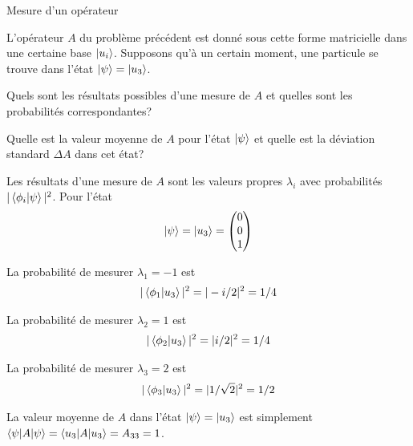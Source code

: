 \documentclass[12pt,solution=false]{uqtrassignment}
\begin{document}
\begin{problem}{Mesure d'un opérateur} %

L'opérateur $A$ du problème précédent
  est donné sous cette forme matricielle
  dans une certaine base $\ket{u_i}$.
%
Supposons qu'à un certain moment,
  une particule se trouve dans l'état $\ket{\psi}=\ket{u_3}$.
%

\subproblem
Quels sont les résultats possibles d'une mesure de $A$
  et quelles sont les probabilités correspondantes?
  
\subproblem
Quelle est la valeur moyenne de $A$ pour l'état $\ket{\psi}$
  et quelle est la déviation standard $\Delta A$ dans cet état?

\begin{solution}

\subproblem
Les résultats d'une mesure de $A$ sont les valeurs propres $\lambda_i$
  avec probabilités $\vert \braket{\phi_i \vert \psi} \vert^2$.
%
Pour l'état
\begin{align}
  \ket{\psi} = \ket{u_3} =
  \begin{pmatrix}
  0\\
  0\\
  1
  \end{pmatrix}
\end{align}

La probabilité de mesurer $\lambda_1 = -1$ est
\begin{align}
  \vert \braket{\phi_1 \vert u_3} \vert^2
  = \vert -i/2 \vert^2
  = 1/4
\end{align}

La probabilité de mesurer $\lambda_2 = 1$ est
\begin{align}
  \vert \braket{\phi_2 \vert u_3} \vert^2
  = \vert i/2 \vert^2
  = 1/4
\end{align}

La probabilité de mesurer $\lambda_3 = 2$ est
\begin{align}
  \vert \braket{\phi_3 \vert u_3} \vert^2
  = \vert 1/\sqrt{2} \vert^2
  = 1/2
\end{align}

\subproblem
La valeur moyenne de $A$ dans l'état $\ket{\psi}=\ket{u_3}$ 
  est simplement
  $\braket{\psi \vert A \vert \psi} = \braket{u_3 \vert A \vert u_3} = A_{33} = 1$.

\end{solution}
\end{problem}
\end{document}
